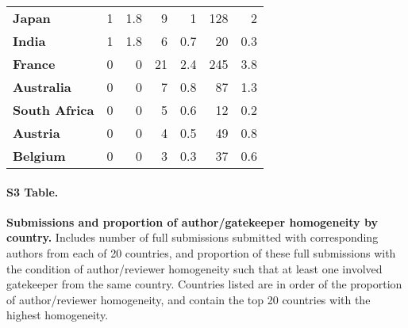 \documentclass[10pt,letterpaper]{article}
\begin{document}
\begin{table}[!h]
\begin{tabular}{l|rr|rr|rr}
\textbf{Japan}          & 1                       & 1.8                     & 9                         & 1                        & 128                     & 2                       \\
\textbf{India}          & 1                       & 1.8                     & 6                         & 0.7                      & 20                      & 0.3                     \\
\textbf{France}         & 0                       & 0                       & 21                        & 2.4                      & 245                     & 3.8                     \\
\textbf{Australia}      & 0                       & 0                       & 7                         & 0.8                      & 87                      & 1.3                     \\
\textbf{South Africa}   & 0                       & 0                       & 5                         & 0.6                      & 12                      & 0.2                     \\
\textbf{Austria}        & 0                       & 0                       & 4                         & 0.5                      & 49                      & 0.8                     \\
\textbf{Belgium}        & 0                       & 0                       & 3                         & 0.3                      & 37                      & 0.6                    
\end{tabular}
\end{table}

\newpage
\paragraph*{S3 Table.}
\label{S3_Table}
{\bf Submissions and proportion of author/gatekeeper homogeneity by country.} Includes number of full submissions submitted with corresponding authors from each of 20 countries, and proportion of these full submissions with the condition of author/reviewer homogeneity such that at least one involved gatekeeper from the same country. Countries listed are in order of the proportion of author/reviewer homogeneity, and contain the top 20 countries with the highest homogeneity. 
\end{document}
